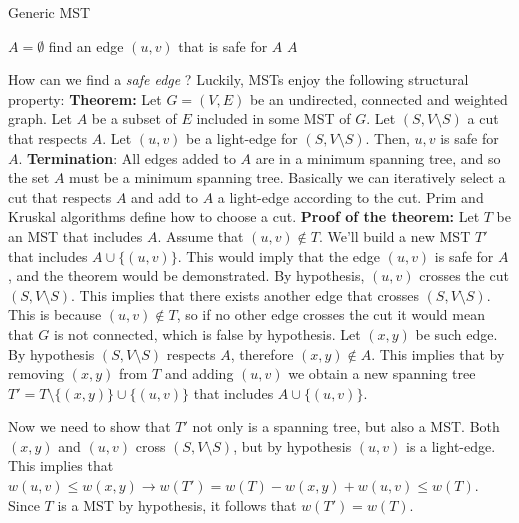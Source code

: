 \begin{algorithm}
\caption{Generic MST}\label{Gen.MST}
    \begin{algorithmic}[1]
        \State $A = \emptyset$
            \State find an edge $(u, v)$ that is safe for $A$
        \EndWhile
        \Return $A$
    \EndProcedure
    \end{algorithmic}
\end{algorithm}
How can we find a \textit{safe edge} ? Luckily, MSTs enjoy the following structural property:\newline\newline
\textbf{Theorem:} Let $G=(V, E)$ be an undirected, connected and weighted graph. Let $A$ be a subset of $E$ included in some MST of $G$. Let $(S, V \setminus S)$ a cut that respects $A$. Let $(u, v)$ be a light-edge for $(S, V \setminus S)$. Then, $u, v$ is safe for $A$.\newline\newline
\textbf{Termination}: All edges added to $A$ are in a minimum spanning tree, and so the set $A$ must be a minimum spanning tree.\newline\newline
Basically we can iteratively select a cut that respects $A$ and add to $A$ a light-edge according to the cut. Prim and Kruskal algorithms define how to choose a cut.\newline\newline
\textbf{Proof of the theorem:}\newline
Let $T$ be an MST that includes $A$. Assume that $(u, v) \notin T$. We'll build a new MST $T'$ that includes $A \cup \{(u, v)\}$. This would imply that the edge $(u, v)$ is safe for $A$, and the theorem would be demonstrated. By hypothesis, $(u, v)$ crosses the cut $(S, V \setminus S)$. This implies that there exists another edge that crosses $(S, V \setminus S)$. This is because $(u, v) \notin T$, so if no other edge crosses the cut it would mean that $G$ is not connected, which is false by hypothesis. Let $(x, y)$ be such edge. By hypothesis $(S, V \setminus S)$ respects $A$, therefore $(x, y) \notin A$. This implies that by removing $(x,y)$ from $T$ and adding $(u, v)$ we obtain a new spanning tree $T' = T \setminus \{(x, y)\} \cup \{(u, v)\}$ that includes $A \cup \{(u, v)\}$.

Now we need to show that $T'$ not only is a spanning tree, but also a MST. Both $(x, y)$ and $(u, v)$ cross $(S, V \setminus S)$, but by hypothesis $(u, v)$ is a light-edge. This implies that $w(u, v) \leq w(x, y) \rightarrow w(T') = w(T) - w(x, y) + w(u, v) \leq w(T)$. Since $T$ is a MST by hypothesis, it follows that $w(T') = w(T)$.

